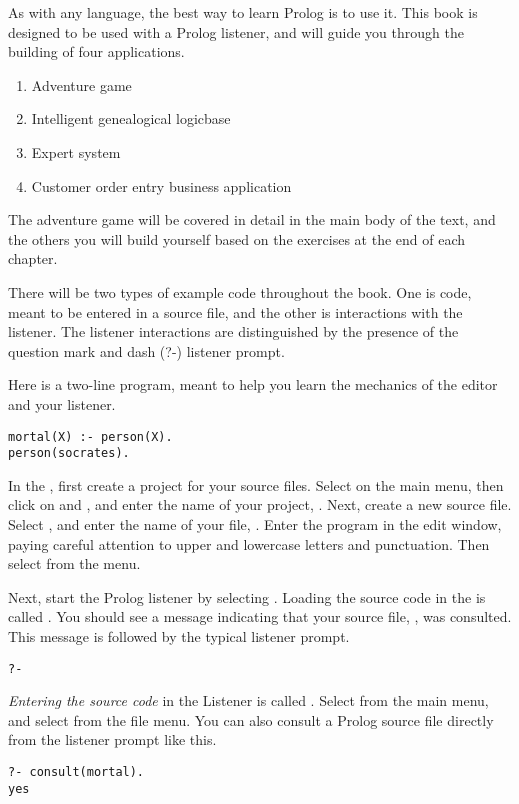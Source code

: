 
As with any language, the best way to learn Prolog is to use it. This book is
designed to be used with a Prolog listener, and will guide you through the
building of four applications.
\begin{enumerate}[nosep]
  \item 
Adventure game
  \item 
Intelligent genealogical logicbase
  \item 
Expert system
  \item 
Customer order entry business application
\end{enumerate}
The adventure game will be covered in detail in the main body of the text, and
the others you will build yourself based on the exercises at the end of each
chapter.

There will be two types of example code throughout the book. One is code, meant
to be entered in a source file, and the other is interactions with the listener.
The listener interactions are distinguished by the presence of the question mark
and dash (?-) listener prompt.

Here is a two-line program, meant to help you learn the mechanics of the editor
and your listener.
\begin{verbatim}
mortal(X) :- person(X).
person(socrates).
\end{verbatim}

In the , first create a project for your source files.
Select  on the main menu, then click on  and
, and enter the name of your project, .
Next, create a new source file. Select , and enter the name
of your file, . Enter the program in the edit window, paying
careful attention to upper and lowercase letters and punctuation. Then select
 from the menu.

Next, start the Prolog listener by selecting . Loading the source code in the  is called
. You should see a message indicating that your source file,
, was consulted. This message is followed by the typical
listener prompt.
\begin{verbatim}
?-
\end{verbatim}
\emph{Entering the source code} in the Listener is called .
Select  from the main menu, and select 
from the file menu. You can also consult a Prolog source file directly from the
listener prompt like this.
\begin{verbatim}
?- consult(mortal).
yes
\end{verbatim}

